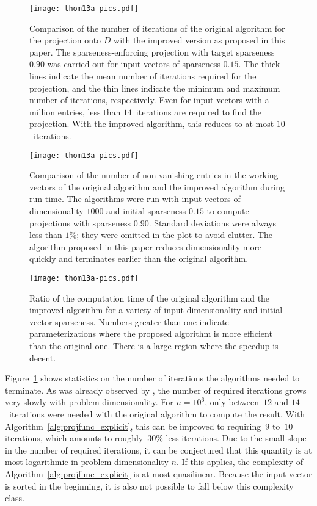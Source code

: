 \documentclass[twoside,11pt]{article}
\newcommand{\0}{\mathcal{O}}
\begin{document}
\begin{figure}[t]
  \centering
  \texttt{[image: thom13a-pics.pdf]}
  \caption{Comparison of the number of iterations of the original algorithm for the projection onto $D$ with the improved version as proposed in this paper. The sparseness-enforcing projection with target sparseness $0.90$ was carried out for input vectors of sparseness $0.15$. The thick lines indicate the mean number of iterations required for the projection, and the thin lines indicate the minimum and maximum number of iterations, respectively. Even for input vectors with a million entries, less than $14$~iterations are required to find the projection. With the improved algorithm, this reduces to at most $10$~iterations.}
  \label{fig:alg_iterations}
\end{figure}
\begin{figure}[p]
  \centering
  \texttt{[image: thom13a-pics.pdf]}
  \caption{Comparison of the number of non-vanishing entries in the working vectors of the original algorithm and the improved algorithm during run-time. The algorithms were run with input vectors of dimensionality $1000$ and initial sparseness $0.15$ to compute projections with sparseness $0.90$. Standard deviations were always less than $1\%$; they were omitted in the plot to avoid clutter. The algorithm proposed in this paper reduces dimensionality more quickly and terminates earlier than the original algorithm.}
  \label{fig:alg_iteration_dims}
\end{figure}
\begin{figure}[p]
  \centering
  \texttt{[image: thom13a-pics.pdf]}
  \caption{Ratio of the computation time of the original algorithm and the improved algorithm for a variety of input dimensionality and initial vector sparseness. Numbers greater than one indicate parameterizations where the proposed algorithm is more efficient than the original one. There is a large region where the speedup is decent.}
  \label{fig:alg_timings}
\end{figure}

Figure~\ref{fig:alg_iterations} shows statistics on the number of iterations the algorithms needed to terminate.
As was already observed by \cite{Hoyer2004}, the number of required iterations grows very slowly with problem dimensionality.
For $n = 10^6$, only between~$12$ and $14$~iterations were needed with the original algorithm to compute the result.
With Algorithm~\ref{alg:projfunc_explicit}, this can be improved to requiring~$9$ to~$10$ iterations, which amounts to roughly~$30\%$ less iterations.
Due to the small slope in the number of required iterations, it can be conjectured that this quantity is at most logarithmic in problem dimensionality $n$.
If this applies, the complexity of Algorithm~\ref{alg:projfunc_explicit} is at most quasilinear.
Because the input vector is sorted in the beginning, it is also not possible to fall below this complexity class.
\end{document}
